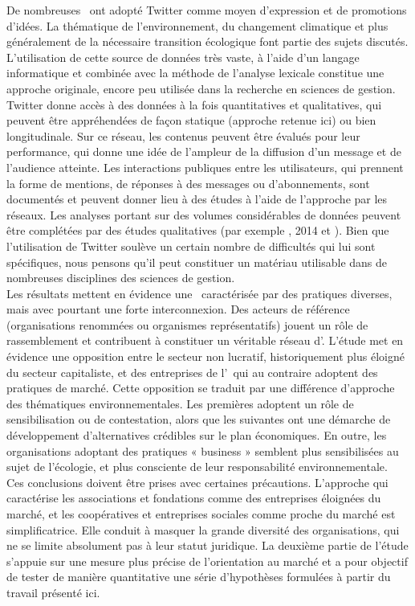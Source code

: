De nombreuses \oess\ ont adopté Twitter comme moyen d’expression et de promotions d’idées. La thématique de l’environnement, du changement climatique et plus généralement de la nécessaire transition écologique font partie des sujets discutés. \\

L’utilisation de cette source de données très vaste, à l’aide d’un langage informatique et combinée avec la méthode de l’analyse lexicale constitue une approche originale, encore peu utilisée dans la recherche en sciences de gestion. Twitter donne accès à des données à la fois quantitatives et qualitatives, qui peuvent être appréhendées de façon statique (approche retenue ici) ou bien longitudinale. Sur ce réseau, les contenus peuvent être évalués pour leur performance, qui donne une idée de l’ampleur de la diffusion d’un message et de l’audience atteinte. Les interactions publiques  entre les utilisateurs, qui prennent la forme de mentions, de réponses à des messages ou d’abonnements, sont documentés et peuvent donner lieu à des études à l’aide de l’approche par les réseaux. Les analyses portant sur des volumes considérables de données peuvent être complétées par des études qualitatives (par exemple \textcite{guo2014tweeting}, 2014 et \textcite{mariaux2017promouvoir}). Bien que l’utilisation de Twitter soulève un certain nombre de difficultés qui lui sont spécifiques, nous pensons qu’il peut constituer un matériau utilisable dans de nombreuses disciplines des sciences de gestion. \\

Les résultats mettent en évidence une \ess\ caractérisée par des pratiques diverses, mais avec pourtant une forte interconnexion. Des acteurs de référence (organisations renommées ou organismes représentatifs) jouent un rôle de rassemblement et contribuent à constituer un véritable réseau d’\oess.  L’étude met en évidence une opposition entre le secteur non lucratif, historiquement plus éloigné du secteur capitaliste, et des entreprises de l’\ess\ qui au contraire adoptent des pratiques de marché. Cette opposition se traduit par une différence d’approche des thématiques environnementales. Les premières adoptent un rôle de sensibilisation ou de contestation, alors que les suivantes ont une démarche de développement d’alternatives crédibles sur le plan économiques. En outre, les organisations adoptant des pratiques « business » semblent plus sensibilisées au sujet de l’écologie, et plus consciente de leur responsabilité environnementale. \\

Ces conclusions doivent être prises avec certaines précautions. L’approche qui caractérise les associations et fondations comme des entreprises éloignées du marché, et les coopératives et entreprises sociales comme proche du marché est simplificatrice. Elle conduit à masquer la grande diversité des organisations, qui ne se limite absolument pas à leur statut juridique. La deuxième partie de l’étude s’appuie sur une mesure plus précise de l’orientation au marché et a pour objectif de tester de manière quantitative une série d’hypothèses formulées à partir du travail présenté ici. 
